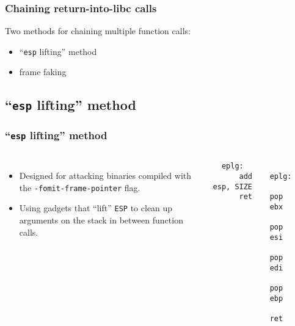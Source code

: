 \documentclass[10pt]{beamer}
\begin{document}
\begin{frame}
  \frametitle{Chaining return-into-libc calls}
  Two methods for chaining multiple function calls:
  \begin{itemize}
    \item ``\texttt{esp} lifting'' method
    \item frame faking
  \end{itemize}
\end{frame}

\subsection{``\texttt{esp} lifting'' method}

\begin{frame}
  \frametitle{``\texttt{esp} lifting'' method}

  \begin{columns}[c]

  \begin{itemize}
    \item Designed for attacking binaries compiled with the
      \texttt{-fomit-frame-pointer} flag.

    \item Using gadgets that ``lift'' \texttt{ESP} to clean up arguments on the
      stack in between function calls.
  \end{itemize}

  \begin{lstlisting}
  eplg:
      add esp, SIZE
      ret
  \end{lstlisting}

  \begin{lstlisting}
  eplg:
      pop ebx
      pop esi
      pop edi
      pop ebp
      ret
  \end{lstlisting}


  \begin{drawstack}[scale=0.54]
    \startframe
    \cell{\dots}
  \end{drawstack}


\end{columns}
\end{frame}
\end{document}

